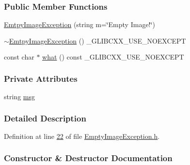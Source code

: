 \subsubsection*{Public Member Functions}
\begin{DoxyCompactItemize}
\item 
\hyperlink{class_vision_1_1_exception_1_1_emtpy_image_exception_ac5ffe210a9b0334c94b30960d4b4a3e8}{Emtpy\+Image\+Exception} (string m=\char`\"{}Empty Image!\char`\"{})
\item 
\hyperlink{class_vision_1_1_exception_1_1_emtpy_image_exception_a525fb499437fb7b2d8612118430549ec}{$\sim$\+Emtpy\+Image\+Exception} () \+\_\+\+G\+L\+I\+B\+C\+X\+X\+\_\+\+U\+S\+E\+\_\+\+N\+O\+E\+X\+C\+E\+P\+T
\item 
const char $\ast$ \hyperlink{class_vision_1_1_exception_1_1_emtpy_image_exception_a07ecf1da15bdf9d26b32ee9044b529f0}{what} () const \+\_\+\+G\+L\+I\+B\+C\+X\+X\+\_\+\+U\+S\+E\+\_\+\+N\+O\+E\+X\+C\+E\+P\+T
\end{DoxyCompactItemize}
\subsubsection*{Private Attributes}
\begin{DoxyCompactItemize}
\item 
string \hyperlink{class_vision_1_1_exception_1_1_emtpy_image_exception_a170fca455cf8c837ce36f26076d094c5}{msg}
\end{DoxyCompactItemize}


\subsubsection{Detailed Description}


Definition at line \hyperlink{_empty_image_exception_8h_source_l00022}{22} of file \hyperlink{_empty_image_exception_8h_source}{Empty\+Image\+Exception.\+h}.



\subsubsection{Constructor \& Destructor Documentation}
\hypertarget{class_vision_1_1_exception_1_1_emtpy_image_exception_ac5ffe210a9b0334c94b30960d4b4a3e8}{}
